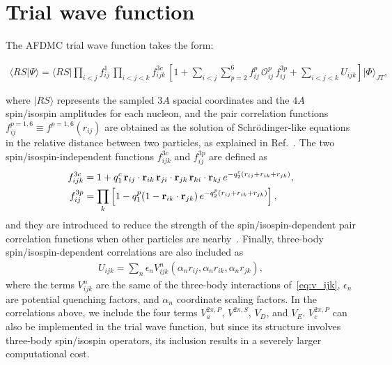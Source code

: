\documentclass[aps,prc,twocolumn,superscriptaddress,showpacs,floatfix,nofootinbib]{revtex4-1}
\begin{document}
\section{Trial wave function}
\label{sec:wf}
The AFDMC trial wave function takes the form:
\begin{widetext}
\begin{align}
\langle RS|\Psi\rangle=\langle RS|\prod_{i<j}f^1_{ij}\,\prod_{i<j<k}f^{3c}_{ijk}\,
\left[1+\sum_{i<j}\sum_{p=2}^6 f^p_{ij}\,\mathcal O_{ij}^p\, f_{ij}^{3p}
+\sum_{i<j<k}U_{ijk}\right]|\Phi\rangle_{JT} ,
\label{eq:psi}
\end{align}
\end{widetext}
where $|RS\rangle$ represents the sampled $3A$ spacial coordinates and the $4A$ spin/isospin amplitudes
for each nucleon, and the pair correlation functions $f^{p=1,6}_{ij}\equiv f^{p=1,6}(r_{ij})$ are obtained as the solution
of Schr\"odinger-like equations in the relative distance between two particles, as explained in Ref.~\cite{Carlson:2015}. 
The two spin/isospin-independent functions $f^{3c}_{ijk}$ and $f^{3p}_{ij}$ are defined as
\begin{align}
f^{3c}_{ijk}&=1+q_1^c\,\vb{r}_{ij}\cdot\vb{r}_{ik}\,\vb{r}_{ji}\cdot\vb{r}_{jk}\,
\vb{r}_{ki}\cdot\vb{r}_{kj}\,e^{-q_2^c(r_{ij}+r_{ik}+r_{jk})} ,
\nonumber \\
f_{ij}^{3p}&=\prod_k\left[1-q_1^p(1-\vb{r}_{ik}\cdot\vb{r}_{jk})\,e^{-q_2^p(r_{ij}+r_{ik}+r_{jk})}\right] ,
\end{align}
and they are introduced to reduce the strength of the spin/isospin-dependent pair correlation functions when 
other particles are nearby~\cite{Pudliner:1997}.
Finally, three-body spin/isospin-dependent correlations are also included as 
\begin{align}
U_{ijk}=\sum_n \epsilon_n V_{ijk}^n(\alpha_n r_{ij},\alpha_n r_{ik},\alpha_n r_{jk}) ,
\end{align}
where the terms $V^n_{ijk}$ are the same of the three-body interactions of~\cref{eq:v_ijk}, 
$\epsilon_n$ are potential quenching factors, and $\alpha_n$ coordinate scaling factors.
In the correlations above, we include the four terms $V_a^{2\pi,P}$, $V^{2\pi,S}$,
$V_D$, and $V_E$. $V_c^{2\pi,P}$ can also be implemented in the trial wave function,
but since its structure involves three-body spin/isospin operators, its inclusion 
results in a severely larger computational cost.
\end{document}
